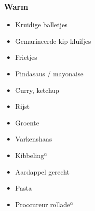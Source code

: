 \subsubsection*{Warm}
\begin{itemize}
	\item	Kruidige balletjes
	\item	Gemarineerde kip kluifjes
	\item	Frietjes
	\item	Pindasaus / mayonaise
	\item	Curry, ketchup
	\item	Rijst
	\item	Groente
	\item	Varkenshaas 
	\item	Kibbeling$^{\alpha}$
	\item	Aardappel gerecht
	\item	Pasta
	\item	Proccureur rollade$^{\alpha}$
\end{itemize}
